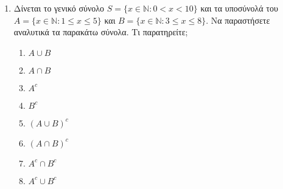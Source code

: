 \begin{enumerate}
\item Δίνεται το γενικό σύνολο $S=\{x\in \mathbb{N} : 0<x<10\}$ και τα υποσύνολά 
  του $A=\{x\in \mathbb{N} : 1\leq x\leq 5\}$ και 
  $B=\{x\in \mathbb{N} : 3\leq x\leq 8\}$. Να παραστήσετε αναλυτικά τα παρακάτω σύνολα. 
  Τι παρατηρείτε;
  \begin{enumerate}[(\roman*)]
\item $A\cup B$
\item $A\cap B$
\item $A^c$
\item $B^c$
\item $(A\cup B)^c$
\item $(A\cap B)^c$
\item $A^c\cap B^c$
\item $A^c\cup B^c$
\end{enumerate}
\end{enumerate}




